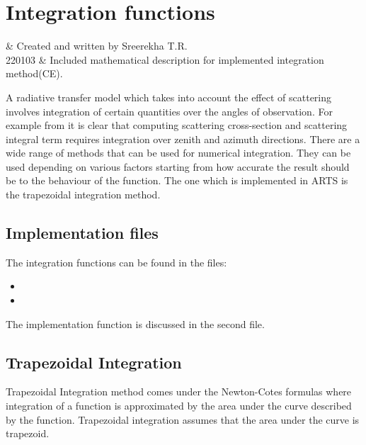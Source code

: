 \chapter{Integration functions}
\label{sec:integration}

 & Created and written by Sreerekha T.R.\\
  220103 & Included mathematical description for implemented integration method(CE).\\
\stophistory

%
%
A radiative transfer model which takes into account the effect of
scattering involves integration of certain quantities over the angles
of observation.  For example from  it
is clear that computing  
scattering cross-section  and scattering integral term requires
integration over zenith and azimuth directions. There are a wide range of
methods that can be used for numerical integration. They can be used
depending on various factors starting from how accurate the result
should be to the behaviour of the function. The one which is
implemented in ARTS is the trapezoidal integration method. 


\section{Implementation files}
\label{sec:integration:files}

The integration functions can be found in the files:
\begin{itemize}
\item {}
\item {}
\end{itemize}
The implementation function is
discussed in the second file. 

\section{Trapezoidal Integration}
\label{sec:integration:trapezoidal}

Trapezoidal Integration method comes under the Newton-Cotes formulas
where integration of a function is approximated by the area under the
curve described by the function.  Trapezoidal integration assumes that
the area under the curve is trapezoid.  

